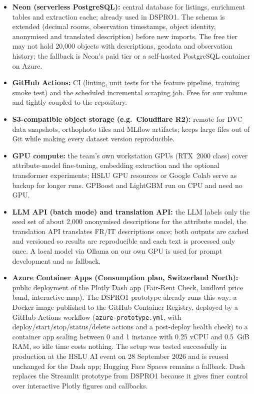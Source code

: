 \documentclass[11pt,a4paper]{article}
\begin{document}
\begin{itemize}
    \item \textbf{Neon (serverless PostgreSQL):} central database for listings, enrichment tables and extraction cache; already used in DSPRO1. The schema is extended (decimal rooms, observation timestamps, object identity, anonymised and translated description) before new imports. The free tier may not hold 20{,}000 objects with descriptions, geodata and observation history; the fallback is Neon's paid tier or a self-hosted PostgreSQL container on Azure.
    \item \textbf{GitHub Actions:} CI (linting, unit tests for the feature pipeline, training smoke test) and the scheduled incremental scraping job. Free for our volume and tightly coupled to the repository.
    \item \textbf{S3-compatible object storage (e.g.\ Cloudflare R2):} remote for DVC data snapshots, orthophoto tiles and MLflow artifacts; keeps large files out of Git while making every dataset version reproducible.
    \item \textbf{GPU compute:} the team's own workstation GPUs (RTX~2000 class) cover attribute-model fine-tuning, embedding extraction and the optional transformer experiments; HSLU GPU resources or Google Colab serve as backup for longer runs. GPBoost and LightGBM run on CPU and need no GPU.
    \item \textbf{LLM API (batch mode) and translation API:} the LLM labels only the seed set of about 2{,}000 anonymised descriptions for the attribute model, the translation API translates FR/IT descriptions once; both outputs are cached and versioned so results are reproducible and each text is processed only once. A local model via Ollama on our own GPU is used for prompt development and as fallback.
    \item \textbf{Azure Container Apps (Consumption plan, Switzerland North):} public deployment of the Plotly Dash app (Fair-Rent Check, landlord price band, interactive map). The DSPRO1 prototype already runs this way: a Docker image published to the GitHub Container Registry, deployed by a GitHub Actions workflow (\texttt{azure-prototype.yml}, with deploy/start/stop/status/delete actions and a post-deploy health check) to a container app scaling between 0 and 1 instance with 0.25 vCPU and 0.5~GiB RAM, so idle time costs nothing. The setup was tested successfully in production at the HSLU AI event on 28 September 2026 and is reused unchanged for the Dash app; Hugging Face Spaces remains a fallback. Dash replaces the Streamlit prototype from DSPRO1 because it gives finer control over interactive Plotly figures and callbacks.
\end{itemize}
\end{document}
